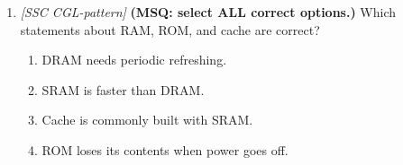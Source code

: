 \documentclass[11pt]{article}
\begin{document}
\begin{enumerate}[label=\textbf{Q\arabic*.}, leftmargin=*]
\begin{enumerate}[label=\Alph*.]
    \item RAM
    \item Cache memory
    \item CPU registers
    \item Masked ROM
  \end{enumerate}
\item \textit{[SSC CGL-pattern]} \textbf{(MSQ: select ALL correct options.)} Which statements about RAM, ROM, and cache are correct?
  \begin{enumerate}[label=\Alph*.]
    \item DRAM needs periodic refreshing.
    \item SRAM is faster than DRAM.
    \item Cache is commonly built with SRAM.
    \item ROM loses its contents when power goes off.
  \end{enumerate}
\end{enumerate}
\def\JKSSBLessonID{8}\def\JKSSBAnswers{0}
\end{document}
